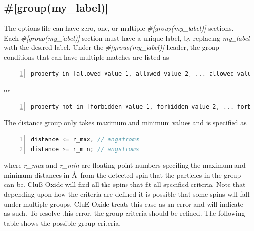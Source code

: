 \documentclass{book}
\begin{document}
\subsection{\#[group(my\_label)]}
The options file can have zero, one, or multiple 
\textit{\#[group(my\_label)]} sections.  
Each \textit{\#[group(my\_label)]} section must have a unique label,
by replacing \textit{my\_label} with the desired label. 
Under the \textit{\#[group(my\_label)]} header, 
the group conditions that can have multiple matches 
are listed as
\begin{lstlisting}[frame=single,numbers=left,language=c]
property in [allowed_value_1, allowed_value_2, ... allowed_value_n];
\end{lstlisting}
or
\begin{lstlisting}[frame=single,numbers=left,language=c]
property not in [forbidden_value_1, forbidden_value_2, ... forbidden_value_n];
\end{lstlisting}
The distance group only takes maximum and minimum values and is specified 
as  
\begin{lstlisting}[frame=single,numbers=left,language=c]
distance <= r_max; // angstroms
distance >= r_min; // angstroms
\end{lstlisting}
where \textit{r\_max} and \textit{r\_min} are floating point numbers
specifing the maximum and minimum distances in \AA~from the detected spin
that the particles in the group can be.
CluE Oxide will find all the spins that fit all specified criteria.
Note that depending upon how the criteria are defined it is possible that
some spins will fall under multiple groups. 
CluE Oxide treats this case as an error and will indicate as such. 
To resolve this error, the group criteria should be refined.
The following table shows the possible group criteria.
\end{document}
